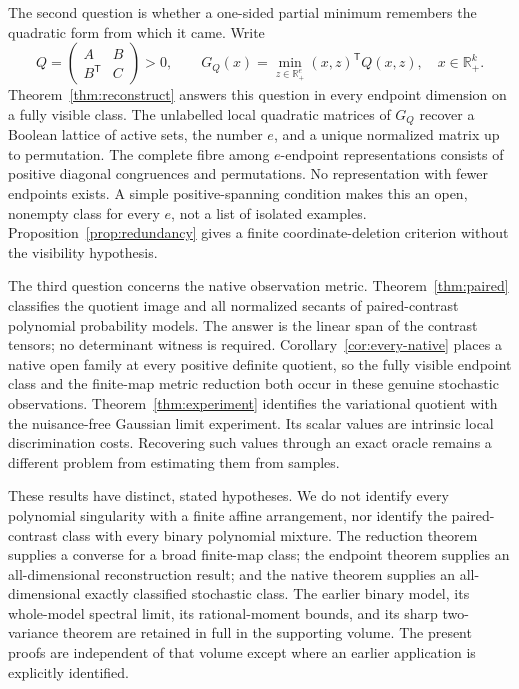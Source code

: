 \documentclass[11pt,reqno]{amsart}
\numberwithin{equation}{section}
\theoremstyle{definition}
\theoremstyle{remark}
\newcommand{\R}{\mathbb R}
\begin{document}
The second question is whether a one-sided partial minimum remembers the quadratic form from which it came. Write
\begin{equation}\label{eq:intro-profile}
 Q=\begin{pmatrix}A&B\\B^{\mathsf T}&C\end{pmatrix}>0,
 \qquad G_Q(x)=\min_{z\in\R_+^e}(x,z)^{\mathsf T}Q(x,z),\quad x\in\R_+^k.
\end{equation}
Theorem~\ref{thm:reconstruct} answers this question in every endpoint dimension on a fully visible class. The unlabelled local quadratic matrices of $G_Q$ recover a Boolean lattice of active sets, the number $e$, and a unique normalized matrix up to permutation. The complete fibre among $e$-endpoint representations consists of positive diagonal congruences and permutations. No representation with fewer endpoints exists. A simple positive-spanning condition makes this an open, nonempty class for every $e$, not a list of isolated examples. Proposition~\ref{prop:redundancy} gives a finite coordinate-deletion criterion without the visibility hypothesis.

The third question concerns the native observation metric. Theorem~\ref{thm:paired} classifies the quotient image and all normalized secants of paired-contrast polynomial probability models. The answer is the linear span of the contrast tensors; no determinant witness is required. Corollary~\ref{cor:every-native} places a native open family at every positive definite quotient, so the fully visible endpoint class and the finite-map metric reduction both occur in these genuine stochastic observations. Theorem~\ref{thm:experiment} identifies the variational quotient with the nuisance-free Gaussian limit experiment. Its scalar values are intrinsic local discrimination costs. Recovering such values through an exact oracle remains a different problem from estimating them from samples.

These results have distinct, stated hypotheses. We do not identify every polynomial singularity with a finite affine arrangement, nor identify the paired-contrast class with every binary polynomial mixture. The reduction theorem supplies a converse for a broad finite-map class; the endpoint theorem supplies an all-dimensional reconstruction result; and the native theorem supplies an all-dimensional exactly classified stochastic class. The earlier binary model, its whole-model spectral limit, its rational-moment bounds, and its sharp two-variance theorem are retained in full in the supporting volume. The present proofs are independent of that volume except where an earlier application is explicitly identified.
\end{document}
